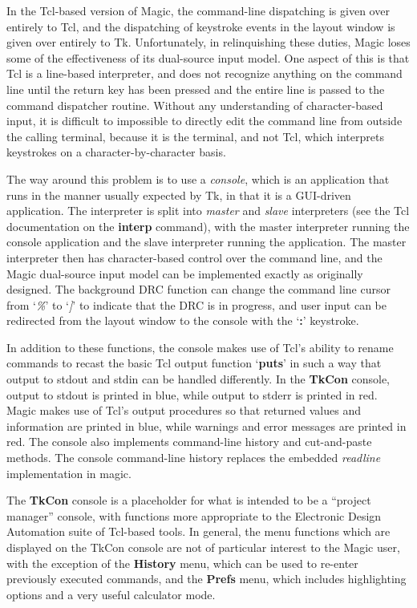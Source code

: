 \documentclass[letterpaper,twoside,12pt]{article}
\begin{document}
In the Tcl-based version of Magic, the command-line dispatching is given
over entirely to Tcl, and the dispatching of keystroke events in the layout
window is given over entirely to Tk.  Unfortunately, in relinquishing
these duties, Magic loses some of the effectiveness of its dual-source
input model.  One aspect of this is that Tcl is a line-based interpreter,
and does not recognize anything on the command line until the return key
has been pressed and the entire line is passed to the command dispatcher
routine.  Without any understanding of character-based input, it is
difficult to impossible to directly edit the command line from outside the
calling terminal, because it is the terminal, and not Tcl, which interprets
keystrokes on a character-by-character basis.

The way around this problem is to use a {\itshape console}, which is an
application that runs in the manner usually expected by Tk, in that it is
a GUI-driven application.  The interpreter is split into {\itshape master}
and {\itshape slave} interpreters (see the Tcl documentation on the
{\bfseries interp} command), with the master interpreter running the
console application and the slave interpreter running the application.
The master interpreter then has character-based control over the command
line, and the Magic dual-source input model can be implemented exactly as
originally designed.  The background DRC function can change the command
line cursor from `{\itshape \%}' to `{\itshape ]}' to indicate that the
DRC is in progress, and user input can be redirected from the layout
window to the console with the `{\bfseries :}' keystroke.

In addition to these functions, the console makes use of Tcl's ability
to rename commands to recast the basic Tcl output function
`{\bfseries puts}' in such a way that output to {\ttfamily stdout} and
{\ttfamily stdin} can be handled differently.  In the {\bfseries TkCon}
console, output to {\ttfamily stdout} is printed in blue, while output
to {\ttfamily stderr} is printed in red.  Magic makes use of Tcl's
output procedures so that returned values and information are printed
in blue, while warnings and error messages are printed in red.  The
console also implements command-line history and cut-and-paste methods.
The console command-line history replaces the embedded {\itshape readline}
implementation in magic.

The {\bfseries TkCon} console is a placeholder for what is intended to
be a ``project manager'' console, with functions more appropriate to
the Electronic Design Automation suite of Tcl-based tools.  In general,
the menu functions which are displayed on the TkCon console are not
of particular interest to the Magic user, with the exception of the
{\bfseries History} menu, which can be used to re-enter previously
executed commands, and the {\bfseries Prefs} menu, which includes
highlighting options and a very useful calculator mode.
\end{document}
